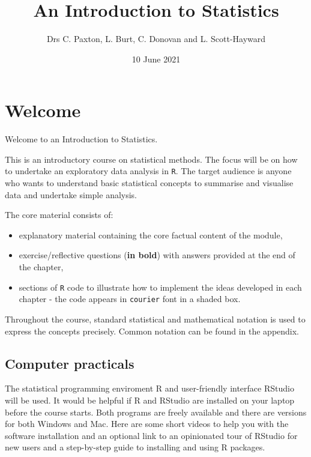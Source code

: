\documentclass[
  oneside]{krantz}
\title{An Introduction to Statistics}
\author{Drs C. Paxton, L. Burt, C. Donovan and L. Scott-Hayward}
\date{10 June 2021}
\providecommand{\tightlist}{%
  \setlength{\itemsep}{0pt}\setlength{\parskip}{0pt}}
\begin{document}
\maketitle

{
\hypersetup{linkcolor=}
\setcounter{tocdepth}{2}
\tableofcontents
}
\hypertarget{welcome}{%
\chapter*{Welcome}\label{welcome}}


Welcome to an Introduction to Statistics.

This is an introductory course on statistical methods. The focus will be on how to undertake an exploratory data analysis in \texttt{R}. The target audience is anyone who wants to understand basic statistical concepts to summarise and visualise data and undertake simple analysis.

The core material consists of:

\begin{itemize}
\tightlist
\item
  explanatory material containing the core factual content of the module,
\item
  exercise/reflective questions (\textbf{in bold}) with answers provided at the end of the chapter,
\item
  sections of \texttt{R} code to illustrate how to implement the ideas developed in each chapter - the code appears in \texttt{courier} font in a shaded box.
\end{itemize}

Throughout the course, standard statistical and mathematical notation is used to express the concepts precisely. Common notation can be found in the appendix.

\hypertarget{computer-practicals}{%
\section*{Computer practicals}\label{computer-practicals}}


The statistical programming enviroment R and user-friendly interface RStudio will be used. It would be helpful if R and RStudio are installed on your laptop before the course starts. Both programs are freely available and there are versions for both Windows and Mac. Here are some short videos to help you with the software installation and an optional link to an opinionated tour of RStudio for new users and a step-by-step guide to installing and using R packages.
\end{document}
